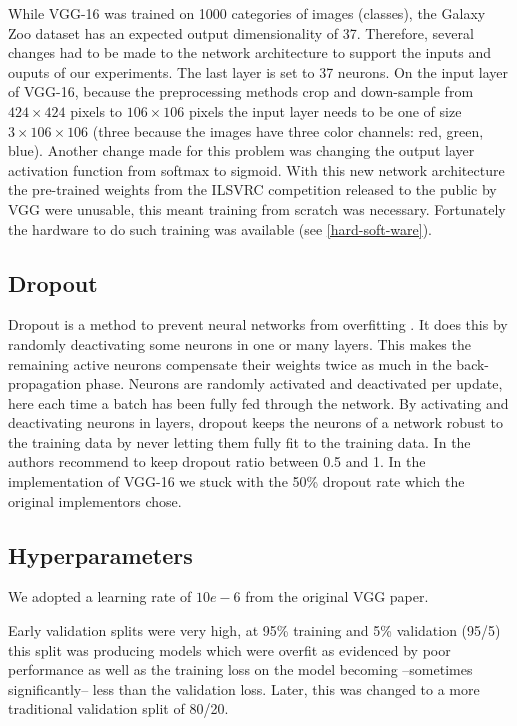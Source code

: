 While VGG-16 was trained on 1000 categories of images (classes), the Galaxy Zoo dataset has an expected output dimensionality of 37. Therefore, several changes had to be made to the network architecture to support the inputs and ouputs of our experiments. The last layer is set to 37 neurons. On the input layer of VGG-16, because the preprocessing methods crop and down-sample from $424 \times 424$ pixels to $106 \times 106$ pixels the input layer needs to be one of size $3 \times 106 \times 106$ (three because the images have three color channels: red, green, blue). Another change made for this problem was changing the output layer activation function from softmax to sigmoid. With this new network architecture the pre-trained weights from the ILSVRC competition released to the public by VGG were unusable, this meant training from scratch was necessary. Fortunately the hardware to do such training was available (see \ref{hard-soft-ware}).

\subsection{Dropout}
Dropout is a method to prevent neural networks from overfitting \cite{dropout}. It does this by randomly deactivating some neurons in one or many layers. This makes the remaining active neurons compensate their weights twice as much in the back-propagation phase. Neurons are randomly activated and deactivated per update, here each time a batch has been fully fed through the network. By activating and deactivating neurons in layers, dropout keeps the neurons of a network robust to the training data by never letting them fully fit to the training data. In \cite{dropout} the authors recommend to keep dropout ratio between 0.5 and 1. In the implementation of VGG-16 we stuck with the 50\% dropout rate which the original implementors chose.

\subsection{Hyperparameters}

We adopted a learning rate of $10e-6$ from the original VGG paper.

Early validation splits were very high, at 95\% training and 5\% validation (95/5) this split was producing models which were overfit as evidenced by poor performance as well as the training loss on the model becoming --sometimes significantly-- less than the validation loss. Later, this was changed to a more traditional validation split of 80/20.

